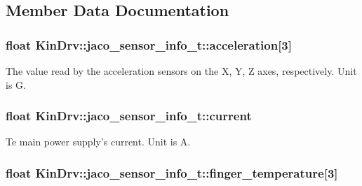 \subsection{Member Data Documentation}
\hypertarget{structKinDrv_1_1jaco__sensor__info__t_ae8fbd5b747a55c117509eb6a436b61c2}{
\subsubsection[{acceleration}]{\setlength{\rightskip}{0pt plus 5cm}float Kin\+Drv\+::jaco\+\_\+sensor\+\_\+info\+\_\+t\+::acceleration\mbox{[}3\mbox{]}}}\label{structKinDrv_1_1jaco__sensor__info__t_ae8fbd5b747a55c117509eb6a436b61c2}
The value read by the acceleration sensors on the X, Y, Z axes, respectively. Unit is G. \hypertarget{structKinDrv_1_1jaco__sensor__info__t_aabc09f5743bec6756dc01a551ea8b9e0}{
\subsubsection[{current}]{\setlength{\rightskip}{0pt plus 5cm}float Kin\+Drv\+::jaco\+\_\+sensor\+\_\+info\+\_\+t\+::current}}\label{structKinDrv_1_1jaco__sensor__info__t_aabc09f5743bec6756dc01a551ea8b9e0}
Te main power supply's current. Unit is A. \hypertarget{structKinDrv_1_1jaco__sensor__info__t_af71911fccee90d67d7ca00d74ef6bbef}{
\subsubsection[{finger\+\_\+temperature}]{\setlength{\rightskip}{0pt plus 5cm}float Kin\+Drv\+::jaco\+\_\+sensor\+\_\+info\+\_\+t\+::finger\+\_\+temperature\mbox{[}3\mbox{]}}}\label{structKinDrv_1_1jaco__sensor__info__t_af71911fccee90d67d7ca00d74ef6bbef}

